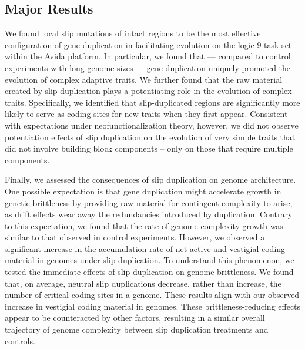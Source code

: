 \subsection{Major Results}

We found local slip mutations of intact regions to be the most effective configuration of gene duplication in facilitating evolution on the logic-9 task set within the Avida platform.
In particular, we found that --- compared to control experiments with long genome sizes --- gene duplication uniquely promoted the evolution of complex adaptive traits.
We further found that the raw material created by slip duplication plays a potentiating role in the evolution of complex traits.
Specifically, we identified that slip-duplicated regions are significantly more likely to serve as coding sites for new traits when they first appear.
Consistent with expectations under neofunctionalization theory, however, we did not observe potentiation effects of slip duplication on the evolution of very simple traits that did not involve building block components -- only on those that require multiple components.

Finally, we assessed the consequences of slip duplication on genome architecture.
One possible expectation is that gene duplication might accelerate growth in genetic brittleness by providing raw material for contingent complexity to arise, as drift effects wear away the redundancies introduced by duplication.
Contrary to this expectation, we found that the rate of genome complexity growth was similar to that observed in control experiments.
However, we observed a significant increase in the accumulation rate of net active and vestigial coding material in genomes under slip duplication.
To understand this phenomenon, we tested the immediate effects of slip duplication on genome brittleness.
We found that, on average, neutral slip duplications decrease, rather than increase, the number of critical coding sites in a genome.
These results align with our observed increase in vestigial coding material in genomes.
These brittleness-reducing effects appear to be counteracted by other factors, resulting in a similar overall trajectory of genome complexity between slip duplication treatments and controls.
